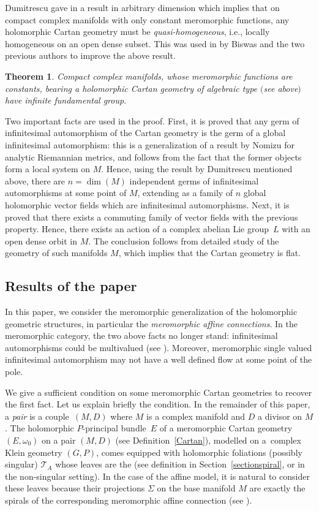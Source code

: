 \documentclass[pdftex]{sigma}
\numberwithin{equation}{section}
\newtheorem{Theorem}{Theorem}[section]
\begin{document}
 Dumitrescu gave in \cite{Dumitrescu1} a result in arbitrary dimension which implies that on compact complex manifolds with only constant meromorphic functions, any holomorphic Cartan geometry must be \textit{quasi-homogeneous}, i.e., locally homogeneous on an open dense subset. This was used in \cite{BDM} by Biswas and the two previous authors to improve the above result.

 \begin{Theorem}\label{theoremBDM} Compact complex manifolds, whose meromorphic functions are constants, bearing a holomorphic Cartan geometry of algebraic
type $($see above$)$ have infinite fundamental group.
 \end{Theorem}
Two important facts are used in the proof. First, it is proved that any germ of infinitesimal automorphism of the Cartan geometry is the germ of a global infinitesimal automorphism: this is a generalization of a result by Nomizu \cite{Nomizu} for analytic Riemannian metrics, and follows from the fact that the former objects form a local system on $M$. Hence, using the result by Dumitrescu mentioned above, there are $n=\dim(M)$ independent germs of infinitesimal automorphisms at some point of $M$, extending as a family of $n$ global holomorphic vector fields which are infinitesimal automorphisms. Next, it is proved that there exists a commuting family of vector fields with the previous property. Hence, there exists an action of a complex abelian Lie group~$L$ with an open dense orbit in $M$. The conclusion follows from detailed study of the geometry of such manifolds $M$, which implies that the Cartan geometry is flat.

\subsection{Results of the paper}
In this paper, we consider the meromorphic generalization of the holomorphic geometric structures, in particular the \textit{meromorphic affine connections}. In the meromorphic category, the two above facts no longer stand: infinitesimal automorphisms could be multivalued (see \cite[Example~3.8]{BlazquezCasale}). Moreover, meromorphic single valued infinitesimal automorphism may not have a well defined flow at some point of the pole.

 We give a sufficient condition on some meromorphic Cartan geometries to recover the first fact. Let us explain briefly the condition. In the remainder of this paper, a \textit{pair} is a couple~$(M,D)$ where $M$ is a complex manifold and $D$ a divisor on $M$. The holomorphic $P$-principal bundle~$E$ of a meromorphic Cartan geometry $(E,\omega_0)$ on a pair $(M,D)$ (see Definition~\ref{Cartan}), modelled on a~complex Klein geometry $(G,P)$, comes equipped with holomorphic foliations (possibly singular) $\mathcal{T}_A$ whose leaves are the  (see definition in Section~\ref{sectionspiral}, or \cite[Definition~4.16]{Sharpe} in the non-singular setting). In the case of the affine model, it is natural to consider these leaves because their projections $\Sigma$ on the base manifold $M$ are exactly the spirals of the corresponding meromorphic affine connection (see \cite[p.~344]{Sharpe}).
\end{document}
